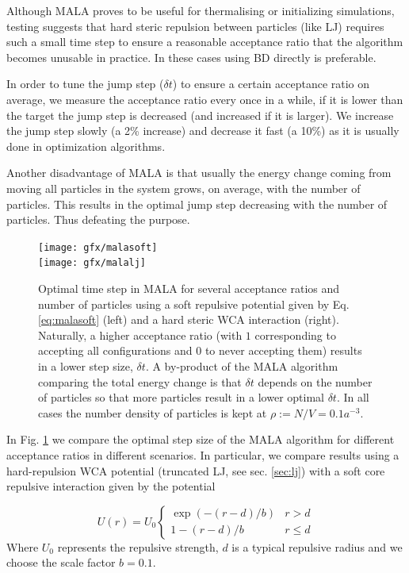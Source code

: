 \documentclass[twoside,openright,titlepage,numbers=noenddot,%
headinclude,footinclude,cleardoublepage=empty,abstract=on,
BCOR=5mm,fontsize=11pt, dvipsnames, paper=b5
]{scrreprt}
\newcommand{\dt}{\delta t}
\begin{document}
Although MALA proves to be useful for thermalising or initializing simulations, testing suggests that hard steric repulsion between particles (like LJ) requires such a small time step to ensure a reasonable acceptance ratio that the algorithm becomes unusable in practice. In these cases using \gls{BD} directly is preferable.

In order to tune the jump step ($\dt$) to ensure a certain acceptance ratio on average, we measure the acceptance ratio every once in a while, if it is lower than the target the jump step is decreased (and increased if it is larger). We increase the jump step slowly (a 2\% increase) and decrease it fast (a 10\%) as it is usually done in optimization algorithms.

Another disadvantage of MALA is that usually the energy change coming from moving all particles in the system grows, on average, with the number of particles. This results in the optimal jump step decreasing with the number of particles. Thus defeating the purpose.
\begin{figure}[H]
  \centering    
  \texttt{[image: gfx/malasoft]}\\
  \texttt{[image: gfx/malalj]}
  \caption[ ]{Optimal time step in MALA for several acceptance ratios and number of particles using a soft repulsive potential given by Eq. \eqref{eq:malasoft} (left) and a hard steric WCA interaction (right). Naturally, a higher acceptance ratio (with $1$ corresponding to accepting all configurations and $0$ to never accepting them) results in a lower step size, $\dt$. A by-product of the MALA algorithm comparing the total energy change is that $\dt$ depends on the number of particles so that more particles result in a lower optimal $\dt$. In all cases the number density of particles is kept at $\rho := N/V = 0.1a^{-3}$.}
  \label{fig:malastep}
\end{figure}
In Fig. \ref{fig:malastep} we compare the optimal step size of the MALA algorithm for different acceptance ratios in different scenarios. In particular, we compare results using a hard-repulsion WCA potential (truncated \gls{LJ}, see sec. \ref{sec:lj}) with a soft core repulsive interaction given by the potential

\begin{equation}
  \label{eq:malasoft}
U(r)= U_0
\begin{cases}
  \exp(-(r-d)/b) & r>d\\
  1-(r-d)/b & r\le d
\end{cases}
\end{equation}
Where $U_0$ represents the repulsive strength, $d$ is a typical repulsive radius and we choose the scale factor $b=0.1$.
\end{document}
